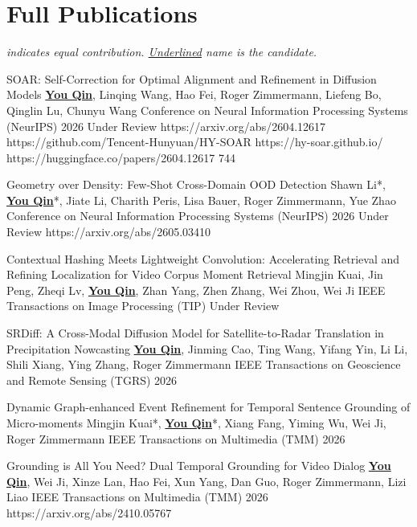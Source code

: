 \section{Full Publications}

{\footnotesize\color{muted}\itshape * indicates equal contribution. \underline{Underlined} name is the candidate.}

\cvPubListStart

  \cvPub
    {SOAR: Self-Correction for Optimal Alignment and Refinement in Diffusion Models}
    {\underline{\textbf{You Qin}}, Linqing Wang, Hao Fei, Roger Zimmermann, Liefeng Bo, Qinglin Lu, Chunyu Wang}
    {Conference on Neural Information Processing Systems (NeurIPS) 2026}
    {Under Review}
    {https://arxiv.org/abs/2604.12617}
    {https://github.com/Tencent-Hunyuan/HY-SOAR}
    {https://hy-soar.github.io/}
    {https://huggingface.co/papers/2604.12617}
    {744}

  \cvPub
    {Geometry over Density: Few-Shot Cross-Domain OOD Detection}
    {Shawn Li*, \underline{\textbf{You Qin}}*, Jiate Li, Charith Peris, Lisa Bauer, Roger Zimmermann, Yue Zhao}
    {Conference on Neural Information Processing Systems (NeurIPS) 2026}
    {Under Review}
    {https://arxiv.org/abs/2605.03410}{}{}{}{}

  \cvPub
    {Contextual Hashing Meets Lightweight Convolution: Accelerating Retrieval and Refining Localization for Video Corpus Moment Retrieval}
    {Mingjin Kuai, Jin Peng, Zheqi Lv, \underline{\textbf{You Qin}}, Zhan Yang, Zhen Zhang, Wei Zhou, Wei Ji}
    {IEEE Transactions on Image Processing (TIP)}
    {Under Review}
    {}{}{}{}{}

  \cvPub
    {SRDiff: A Cross-Modal Diffusion Model for Satellite-to-Radar Translation in Precipitation Nowcasting}
    {\underline{\textbf{You Qin}}, Jinming Cao, Ting Wang, Yifang Yin, Li Li, Shili Xiang, Ying Zhang, Roger Zimmermann}
    {IEEE Transactions on Geoscience and Remote Sensing (TGRS) 2026}
    {}
    {}{}{}{}{}

  \cvPub
    {Dynamic Graph-enhanced Event Refinement for Temporal Sentence Grounding of Micro-moments}
    {Mingjin Kuai*, \underline{\textbf{You Qin}}*, Xiang Fang, Yiming Wu, Wei Ji, Roger Zimmermann}
    {IEEE Transactions on Multimedia (TMM) 2026}
    {}
    {}{}{}{}{}

  \cvPub
    {Grounding is All You Need? Dual Temporal Grounding for Video Dialog}
    {\underline{\textbf{You Qin}}, Wei Ji, Xinze Lan, Hao Fei, Xun Yang, Dan Guo, Roger Zimmermann, Lizi Liao}
    {IEEE Transactions on Multimedia (TMM) 2026}
    {}
    {https://arxiv.org/abs/2410.05767}{}{}{}{}

